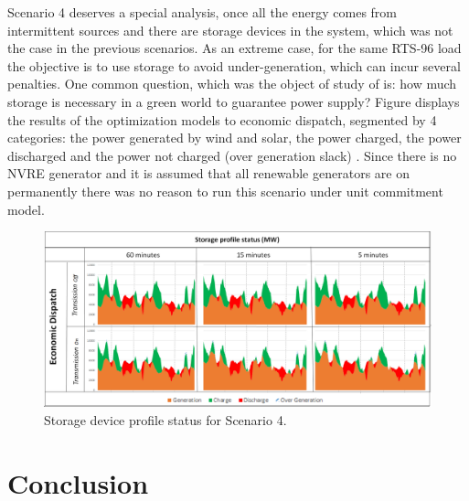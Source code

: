 \documentclass[12pt,LUDisStyle,twosided]{book}
\begin{document}
Scenario 4 deserves a special analysis, once all the energy comes from intermittent sources and there are storage devices in the system, which was not the case in the previous scenarios. As an extreme case, for the same RTS-96 load the objective is to use storage to avoid under-generation, which can incur several penalties. One common question, which was the object of study of \citeauthor{safaei} \cite{safaei} is: how much storage is necessary in a green world to guarantee power supply? Figure \cite{fig:storageprofilestatus} displays the results of the optimization models to economic dispatch, segmented by 4 categories: the power generated by wind and solar, the power charged, the power discharged and the power not charged (over generation slack) . Since there is no NVRE generator and it is assumed that all renewable generators are on permanently there was no reason to run this scenario under unit commitment model. 

\begin{figure}[h] 
	\begin{center}
		\includegraphics[width=\textwidth,keepaspectratio]{StorageProfileStatusS4.png}
	  	\caption{Storage device profile status for Scenario 4.}
     	\label{fig:storageprofilestatus}
	\end{center}
\end{figure}




\chapter{Conclusion}

\appendix



\nocite{*}


\end{document}
